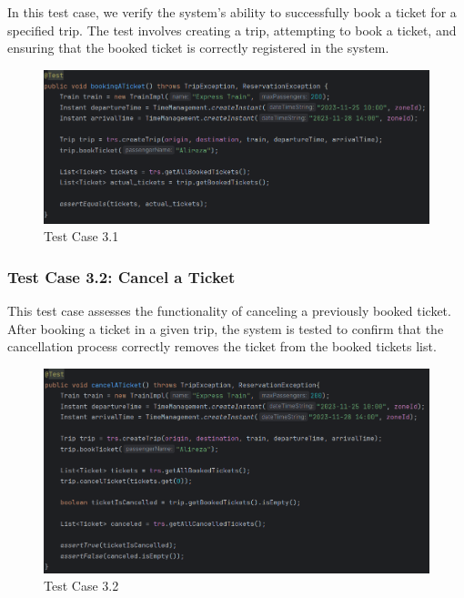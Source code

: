 \documentclass{article}
\begin{document}
In this test case, we verify the system's ability to successfully book a ticket for a specified trip. The test involves creating a trip, attempting to book a ticket, and ensuring that the booked ticket is correctly registered in the system.

\begin{figure}[h]
  \centering
  \includegraphics[width=1.0\textwidth]{pictures/T3-1.png}
  \caption{Test Case 3.1}
  \label{fig:your_label}
\end{figure}

\pagebreak

\subsubsection{Test Case 3.2: Cancel a Ticket}

This test case assesses the functionality of canceling a previously booked ticket. After booking a ticket in a given trip, the system is tested to confirm that the cancellation process correctly removes the ticket from the booked tickets list.

\begin{figure}[h]
  \centering
  \includegraphics[width=1.0\textwidth]{pictures/T3-2.png}
  \caption{Test Case 3.2}
  \label{fig:your_label}
\end{figure}
\end{document}
